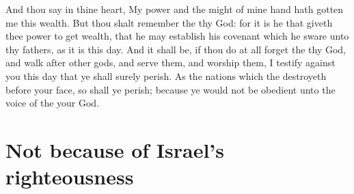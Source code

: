 \begin{biblechapter}
\verse And thou say in thine heart, My power and the might of mine hand hath gotten me this wealth.
\verse But thou shalt remember the \LORD thy God: for it is he that giveth thee power to get wealth, that he may establish his covenant which he sware unto thy fathers, as it is this day.
\verse And it shall be, if thou do at all forget the \LORD thy God, and walk after other gods, and serve them, and worship them, I testify against you this day that ye shall surely perish.
\verse As the nations which the \LORD destroyeth before your face, so shall ye perish; because ye would not be obedient unto the voice of the \LORD your God.
\end{biblechapter}

\section*{Not because of Israel's righteousness}
